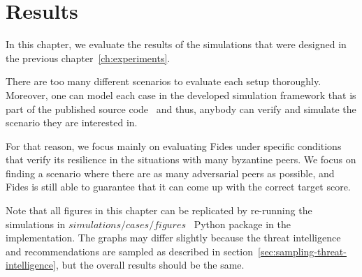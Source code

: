 \chapter{Results}
\label{ch:results}

In this chapter, we evaluate the results of the simulations that were designed in the previous chapter~\ref{ch:experiments}.

There are too many different scenarios to evaluate each setup thoroughly. Moreover, one can model each case in the developed simulation framework that is part of the published source code~\cite{fidesGithub} and thus, anybody can verify and simulate the scenario they are interested in.

For that reason, we focus mainly on evaluating Fides under specific conditions that verify its resilience in the situations with many byzantine peers.
We focus on finding a scenario where there are as many adversarial peers as possible, and Fides is still able to guarantee that it can come up with the correct target score.

Note that all figures in this chapter can be replicated by re-running the simulations in $simulations/cases/figures$~\cite{fidesGithub} Python package in the implementation.
The graphs may differ slightly because the threat intelligence and recommendations are sampled as described in section~\ref{sec:sampling-threat-intelligence}, but the overall results should be the same.





